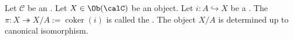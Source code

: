
\begin{definition} \label{definition:quotient_object_of_an_object_of_an_abelian_category_by_a_subobject}
Let $\mathcal{C}$ be an . Let $X \in \Ob(\calC)$ be an object. Let $i: A \hookrightarrow X$ be a . The  $\pi: X \twoheadrightarrow X/A := \operatorname{coker}(i)$ is called the . The object $X/A$ is determined up to canonical isomorphism.
\end{definition}
